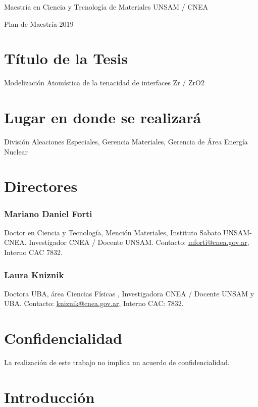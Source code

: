 \begin{center}

Maestría en Ciencia y Tecnología de Materiales UNSAM / CNEA

Plan de Maestría 2019

\end{center}

\section{ Título de la Tesis }

Modelización Atomística de la tenacidad de interfaces Zr / ZrO2

\section{ Lugar en donde se realizará }
División Aleaciones Especiales, Gerencia Materiales, Gerencia de Área Energía 
Nuclear

\section{Directores}

\subsubsection{Mariano Daniel Forti}

Doctor en Ciencia y Tecnología, Mención Materiales, Instituto Sabato 
UNSAM-CNEA. Investigador CNEA / Docente UNSAM. 
Contacto: \href{mailto:mforti@cnea.gov.ar}{mforti@cnea.gov.ar}, Interno CAC 7832.

\subsubsection{Laura Kniznik}

Doctora UBA, área Ciencias Físicas , Investigadora CNEA / Docente UNSAM y UBA. 
Contacto: \href{mailto:kniznik@cnea.gov.ar}{kniznik@cnea.gov.ar}, Interno CAC: 7832.

\section{Confidencialidad}

La realización de este trabajo no implica un acuerdo de confidencialidad.

\section{Introducción }

